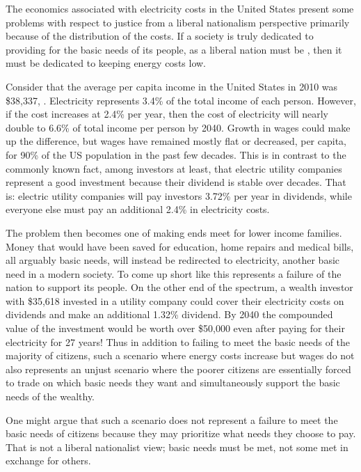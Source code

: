 The economics associated with electricity costs in the United States present 
some problems with respect to justice from a liberal nationalism perspective 
primarily because of the distribution of the costs. If a society is truly 
dedicated to providing for the basic needs of its people, as a liberal nation 
must be \cite{tan}, then it must be dedicated to keeping energy costs low.

Consider that the average per capita income in the United States in 2010 was
\$38,337, \cite{censusHHES}. Electricity represents 3.4\% of the total income 
of each person. However, if the cost increases at 2.4\% per year, then the cost 
of electricity will nearly double to 6.6\% of total income per person by 2040.
Growth in wages could make up the difference, but wages have remained mostly 
flat or decreased, per capita, for 90\% of the US population \cite{pew} in the 
past few decades. This is in contrast to the commonly known fact, among investors 
at least, that electric utility companies represent a good investment because 
their dividend is stable over decades. That is: electric utility companies will 
pay investors 3.72\% per year in dividends, while everyone else must pay an 
additional 2.4\% in electricity costs.

The problem then becomes one of making ends meet for lower income families. Money that would have been saved for education, home repairs and medical bills, all arguably basic needs, will instead be redirected to electricity, another basic need in a modern society. To come up short like this represents a failure of the nation to support its people. On the other end of the spectrum, a wealth investor with \$35,618 invested in a utility company could cover their electricity costs on dividends and make an additional 1.32\% dividend. By 2040 the compounded value of the investment would be worth over \$50,000 even after paying for their electricity for 27 years! Thus in addition to failing to meet the basic needs of the majority of citizens, such a scenario where energy costs increase but wages do not also represents an unjust scenario where the poorer citizens are essentially forced to trade on which basic needs they want and simultaneously support the basic needs of the wealthy. 

One might argue that such a scenario does not represent a failure to meet the basic needs of citizens because they may prioritize what needs they choose to pay. That is not a liberal nationalist view; basic needs must be met, not some met in exchange for others.

